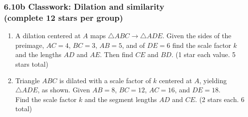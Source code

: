 \documentclass[12pt, twoside]{article}
\begin{document}
\subsubsection*{6.10b Classwork: Dilation and similarity\\[0.25cm]
(complete 12 stars per group)}
  \begin{enumerate}
  
  \item A dilation centered at $A$ maps $\triangle ABC \rightarrow \triangle ADE$. Given the sides of the preimage, $AC = 4$, $BC = 3$, $AB = 5$, and of $DE = 6$ find the scale factor $k$ and the lengths $AD$ and $AE$. Then find $CE$ and $BD$. \hfill (1 star each value. 5 stars total)
    \begin{flushright}
    \end{flushright} \vspace{1.5cm}
  
  \item Triangle $ABC$ is dilated with a scale factor of $k$ centered at $A$, yielding $\triangle ADE$, as shown. Given $AB=8$, $BC=12$, $AC=16$, and $DE=18$. \\[0.25cm] Find the scale factor $k$ and the segment lengths $AD$ and $CE$. \hfill (2 stars each. 6 total)
    \begin{flushright}
    \end{flushright} \vspace{2.5cm}

    
  \newpage


\end{enumerate}
\end{document}
